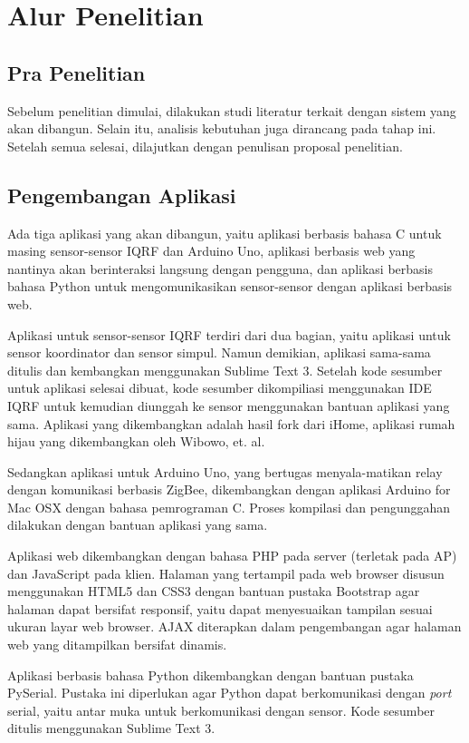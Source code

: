 \section{Alur Penelitian}
	\subsection{Pra Penelitian}
		Sebelum penelitian dimulai, dilakukan studi literatur terkait dengan sistem yang akan dibangun. Selain itu, analisis kebutuhan juga dirancang pada tahap ini. Setelah semua selesai, dilajutkan dengan penulisan proposal penelitian.

	\subsection{Pengembangan Aplikasi}
		Ada tiga aplikasi yang akan dibangun, yaitu aplikasi berbasis bahasa C untuk masing sensor-sensor IQRF dan Arduino Uno, aplikasi berbasis web yang nantinya akan berinteraksi langsung dengan pengguna, dan aplikasi berbasis bahasa Python untuk mengomunikasikan sensor-sensor dengan aplikasi berbasis web.

		Aplikasi untuk sensor-sensor IQRF terdiri dari dua bagian, yaitu aplikasi untuk sensor koordinator dan sensor simpul. Namun demikian, aplikasi sama-sama ditulis dan kembangkan menggunakan Sublime Text 3. Setelah kode sesumber untuk aplikasi selesai dibuat, kode sesumber dikompiliasi menggunakan IDE IQRF untuk kemudian diunggah ke sensor menggunakan bantuan aplikasi yang sama. Aplikasi yang dikembangkan adalah hasil fork dari iHome, aplikasi rumah hijau yang dikembangkan oleh Wibowo, et. al.

		Sedangkan aplikasi untuk Arduino Uno, yang bertugas menyala-matikan relay dengan komunikasi berbasis ZigBee, dikembangkan dengan aplikasi Arduino for Mac OSX dengan bahasa pemrograman C. Proses kompilasi dan pengunggahan dilakukan dengan bantuan aplikasi yang sama.

		Aplikasi web dikembangkan dengan bahasa PHP pada server (terletak pada AP) dan JavaScript pada klien. Halaman yang tertampil pada web browser disusun menggunakan HTML5 dan CSS3 dengan bantuan pustaka Bootstrap agar halaman dapat bersifat responsif, yaitu dapat menyesuaikan tampilan sesuai ukuran layar web browser. AJAX diterapkan dalam pengembangan agar halaman web yang ditampilkan bersifat dinamis.

		Aplikasi berbasis bahasa Python dikembangkan dengan bantuan pustaka PySerial. Pustaka ini diperlukan agar Python dapat berkomunikasi dengan \emph{port} serial, yaitu antar muka untuk berkomunikasi dengan sensor. Kode sesumber ditulis menggunakan Sublime Text 3.

